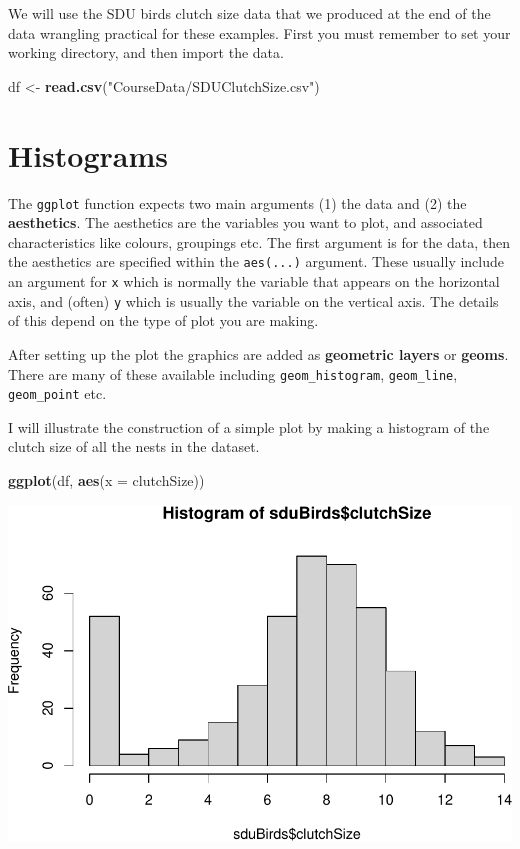 \documentclass[
  a4paperpaper,
]{book}
\newenvironment{Shaded}{\begin{snugshade}}{\end{snugshade}}
\newcommand{\DataTypeTok}[1]{\textcolor[rgb]{0.13,0.29,0.53}{#1}}
\newcommand{\KeywordTok}[1]{\textcolor[rgb]{0.13,0.29,0.53}{\textbf{#1}}}
\newcommand{\NormalTok}[1]{#1}
\newcommand{\StringTok}[1]{\textcolor[rgb]{0.31,0.60,0.02}{#1}}
\begin{document}
We will use the SDU birds clutch size data that we produced at the end of the data wrangling practical for these examples.
First you must remember to set your working directory, and then import the data.

\begin{Shaded}
\begin{Highlighting}[]
\NormalTok{df \textless{}{-}}\StringTok{ }\KeywordTok{read.csv}\NormalTok{(}\StringTok{"CourseData/SDUClutchSize.csv"}\NormalTok{)}
\end{Highlighting}
\end{Shaded}

\hypertarget{histograms}{%
\section{Histograms}\label{histograms}}

The \texttt{ggplot} function expects two main arguments (1) the data and (2) the \textbf{aesthetics}. The aesthetics are the variables you want to plot, and associated characteristics like colours, groupings etc. The first argument is for the data, then the aesthetics are specified within the \texttt{aes(...)} argument. These usually include an argument for \texttt{x} which is normally the variable that appears on the horizontal axis, and (often) \texttt{y} which is usually the variable on the vertical axis. The details of this depend on the type of plot you are making.

After setting up the plot the graphics are added as \textbf{geometric layers} or \textbf{geoms}. There are many of these available including \texttt{geom\_histogram}, \texttt{geom\_line}, \texttt{geom\_point} etc.

I will illustrate the construction of a simple plot by making a histogram of the clutch size of all the nests in the dataset.

\begin{Shaded}
\begin{Highlighting}[]
\KeywordTok{ggplot}\NormalTok{(df, }\KeywordTok{aes}\NormalTok{(}\DataTypeTok{x =}\NormalTok{ clutchSize))}
\end{Highlighting}
\end{Shaded}

\includegraphics{BB852_files/figure-latex/unnamed-chunk-72-1.pdf}
\end{document}
